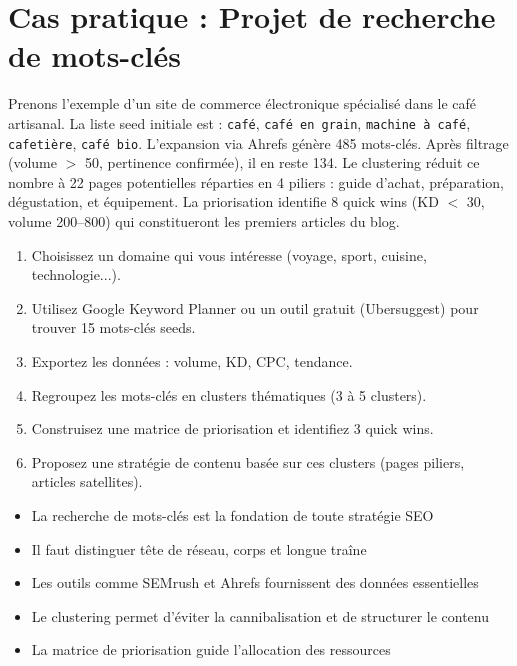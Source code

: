 \documentclass[12pt,a4paper,twoside]{report}
\begin{document}
\section{Cas pratique : Projet de recherche de mots-clés}

Prenons l'exemple d'un site de commerce électronique spécialisé dans le café artisanal. La liste seed initiale est : \texttt{café}, \texttt{café en grain}, \texttt{machine à café}, \texttt{cafetière}, \texttt{café bio}. L'expansion via Ahrefs génère 485 mots-clés. Après filtrage (volume $>$ 50, pertinence confirmée), il en reste 134. Le clustering réduit ce nombre à 22 pages potentielles réparties en 4 piliers : guide d'achat, préparation, dégustation, et équipement. La priorisation identifie 8 quick wins (KD $<$ 30, volume 200--800) qui constitueront les premiers articles du blog.

\begin{exercise}
\begin{enumerate}
    \item Choisissez un domaine qui vous intéresse (voyage, sport, cuisine, technologie...).
    \item Utilisez Google Keyword Planner ou un outil gratuit (Ubersuggest) pour trouver 15 mots-clés seeds.
    \item Exportez les données : volume, KD, CPC, tendance.
    \item Regroupez les mots-clés en clusters thématiques (3 à 5 clusters).
    \item Construisez une matrice de priorisation et identifiez 3 quick wins.
    \item Proposez une stratégie de contenu basée sur ces clusters (pages piliers, articles satellites).
\end{enumerate}
\end{exercise}

\begin{takeaways}
\begin{itemize}
    \item La recherche de mots-clés est la fondation de toute stratégie SEO
    \item Il faut distinguer tête de réseau, corps et longue traîne
    \item Les outils comme SEMrush et Ahrefs fournissent des données essentielles
    \item Le clustering permet d'éviter la cannibalisation et de structurer le contenu
    \item La matrice de priorisation guide l'allocation des ressources
\end{itemize}
\end{takeaways}
\end{document}
